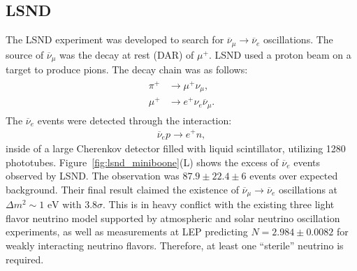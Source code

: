 \documentclass[aps,prd,twocolumn,nofootinbib]{revtex4-1}
\begin{document}
\subsection{LSND}
The LSND experiment was developed to search for $\overline{\nu}_\mu \rightarrow \overline{\nu}_e$ oscillations. The source of $\overline{\nu}_\mu$ was the decay at rest (DAR) of $\mu^+$. LSND used a proton beam on a target to produce pions. The decay chain was as follows:
\begin{align}
  \begin{split}
    \pi^+ &\rightarrow \mu^+  \nu_\mu, \\
    \mu^+ &\rightarrow e^+  \nu_e  \overline{\nu}_\mu.
  \end{split}
\end{align}
The $\overline{\nu}_e$ events were detected through the interaction:
\begin{align}
  \overline{\nu}_e  p \rightarrow e^+ n,
\end{align}
inside of a large Cherenkov detector filled with liquid scintillator, utilizing 1280 phototubes. Figure~\ref{fig:lsnd_miniboone}(L) shows the excess of $\overline{\nu}_e$ events observed by LSND. The observation was $87.9\pm 22.4\pm6$ events over expected background. Their final result claimed the existence of $\overline{\nu}_\mu\rightarrow\overline{\nu}_e$ oscillations at $\Delta m^2 \sim 1\text{ eV}$ with 3.8$\sigma$. This is in heavy conflict with the existing three light flavor neutrino model supported by atmospheric and solar neutrino oscillation experiments, as well as measurements at LEP predicting $N=2.984\pm0.0082$ for weakly interacting neutrino flavors. Therefore, at least one ``sterile'' neutrino is required.
\end{document}
